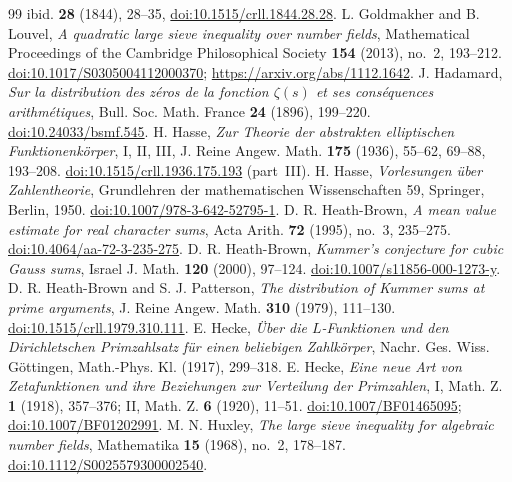 \documentclass[11pt]{article}
\numberwithin{equation}{section}
\begin{document}
\begin{thebibliography}{99}
 ibid. \textbf{28} (1844), 28--35,
 \href{https://doi.org/10.1515/crll.1844.28.28}{doi:10.1515/crll.1844.28.28}.
 L. Goldmakher and B. Louvel,
 \emph{A quadratic large sieve inequality over number fields},
 Mathematical Proceedings of the Cambridge Philosophical Society
 \textbf{154} (2013), no.~2, 193--212.
 \href{https://doi.org/10.1017/S0305004112000370}{doi:10.1017/S0305004112000370};
 \url{https://arxiv.org/abs/1112.1642}.
 J. Hadamard, \emph{Sur la distribution des z\'eros de la fonction $\zeta(s)$ et ses
 cons\'equences arithm\'etiques}, Bull. Soc. Math. France \textbf{24} (1896), 199--220.
 \href{https://doi.org/10.24033/bsmf.545}{doi:10.24033/bsmf.545}.
 H. Hasse, \emph{Zur Theorie der abstrakten elliptischen Funktionenk\"orper}, I, II, III,
 J. Reine Angew. Math. \textbf{175} (1936), 55--62, 69--88, 193--208.
 \href{https://doi.org/10.1515/crll.1936.175.193}{doi:10.1515/crll.1936.175.193} (part~III).
 H. Hasse, \emph{Vorlesungen \"uber Zahlentheorie},
 Grundlehren der mathematischen Wissenschaften 59, Springer, Berlin, 1950.
 \href{https://doi.org/10.1007/978-3-642-52795-1}{doi:10.1007/978-3-642-52795-1}.
 D. R. Heath-Brown, \emph{A mean value estimate for real character sums},
 Acta Arith. \textbf{72} (1995), no.~3, 235--275.
 \href{https://doi.org/10.4064/aa-72-3-235-275}{doi:10.4064/aa-72-3-235-275}.
 D. R. Heath-Brown, \emph{Kummer's conjecture for cubic Gauss sums},
 Israel J. Math. \textbf{120} (2000), 97--124.
 \href{https://doi.org/10.1007/s11856-000-1273-y}{doi:10.1007/s11856-000-1273-y}.
 D. R. Heath-Brown and S. J. Patterson,
 \emph{The distribution of Kummer sums at prime arguments},
 J. Reine Angew. Math. \textbf{310} (1979), 111--130.
 \href{https://doi.org/10.1515/crll.1979.310.111}{doi:10.1515/crll.1979.310.111}.
 E. Hecke, \emph{\"Uber die $L$-Funktionen und den Dirichletschen Primzahlsatz f\"ur einen
 beliebigen Zahlk\"orper}, Nachr. Ges. Wiss. G\"ottingen, Math.-Phys. Kl. (1917), 299--318.
 E. Hecke, \emph{Eine neue Art von Zetafunktionen und ihre Beziehungen zur Verteilung der
 Primzahlen}, I, Math. Z. \textbf{1} (1918), 357--376; II, Math. Z. \textbf{6} (1920), 11--51.
 \href{https://doi.org/10.1007/BF01465095}{doi:10.1007/BF01465095};
 \href{https://doi.org/10.1007/BF01202991}{doi:10.1007/BF01202991}.
 M. N. Huxley, \emph{The large sieve inequality for algebraic number fields},
 Mathematika \textbf{15} (1968), no.~2, 178--187.
 \href{https://doi.org/10.1112/S0025579300002540}{doi:10.1112/S0025579300002540}.

\end{thebibliography}
\end{document}
